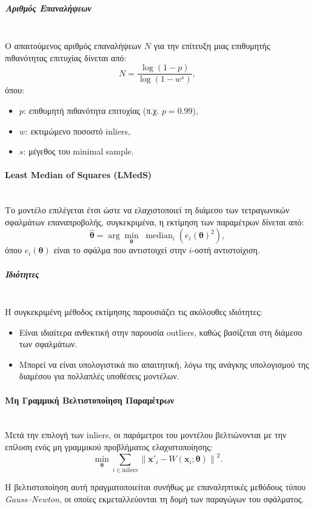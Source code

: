 \documentclass[12pt]{article}
\begin{document}
\subparagraph{Αριθμός Επαναλήψεων}
\mbox{}\\
Ο απαιτούμενος αριθμός επαναλήψεων \(N\) για την επίτευξη μιας επιθυμητής πιθανότητας επιτυχίας δίνεται από:
\[
N = \frac{\log(1 - p)}{\log(1 - w^s)},
\]
όπου:
\begin{itemize}
    \item \(p\): επιθυμητή πιθανότητα επιτυχίας (π.χ. \(p = 0.99\)),
    \item \(w\): εκτιμώμενο ποσοστό inliers,
    \item \(s\): μέγεθος του minimal sample.
\end{itemize}

\paragraph{Least Median of Squares (LMedS)}
\mbox{}\\
Το μοντέλο επιλέγεται έτσι ώστε να ελαχιστοποιεί τη διάμεσο των τετραγωνικών σφαλμάτων επαναπροβολής,
συγκεκριμένα, η εκτίμηση των παραμέτρων δίνεται από:
\[
\hat{\boldsymbol{\theta}} =
\arg\min_{\boldsymbol{\theta}}
\;\operatorname{median}_{i}
\left( e_i(\boldsymbol{\theta})^2 \right),
\]
όπου \(e_i(\boldsymbol{\theta})\) είναι το σφάλμα που αντιστοιχεί στην \(i\)-οστή αντιστοίχιση.

\subparagraph{Ιδιότητες}
\mbox{}\\
Η συγκεκριμένη μέθοδος εκτίμησης παρουσιάζει τις ακόλουθες ιδιότητες:
\begin{itemize}
    \item Είναι ιδιαίτερα ανθεκτική στην παρουσία outliers, καθώς βασίζεται στη διάμεσο των σφαλμάτων.
    \item Μπορεί να είναι υπολογιστικά πιο απαιτητική, λόγω της ανάγκης υπολογισμού της διαμέσου για πολλαπλές υποθέσεις μοντέλων.
\end{itemize}



\paragraph{Μη Γραμμική Βελτιστοποίηση Παραμέτρων}
\mbox{}\\
Μετά την επιλογή των inliers, οι παράμετροι του μοντέλου βελτιώνονται με την επίλυση ενός μη γραμμικού προβλήματος ελαχιστοποίησης:
\[
\min_{\boldsymbol{\theta}}
\sum_{i \in \text{inliers}}
\left\| \mathbf{x}'_i - W(\mathbf{x}_i; \boldsymbol{\theta}) \right\|^2.
\]

Η βελτιστοποίηση αυτή πραγματοποιείται συνήθως με επαναληπτικές μεθόδους τύπου \textit{Gauss--Newton}, 
οι οποίες εκμεταλλεύονται τη δομή των παραγώγων του σφάλματος.
\end{document}
